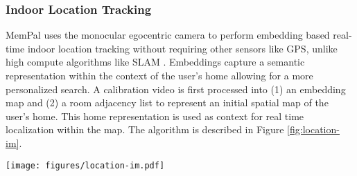 \subsubsection{Indoor Location Tracking}

MemPal uses the monocular egocentric camera to perform embedding based real-time indoor location tracking without requiring other sensors like GPS, unlike high compute algorithms like SLAM \cite{ventura2014global}. Embeddings capture a semantic representation within the context of the user’s home allowing for a more personalized search. A calibration video is first processed into (1) an embedding map and (2) a room adjacency list to represent an initial spatial map of the user's home. This home representation is used as context for real time localization within the map. The algorithm is described in Figure \ref{fig:location-im}. 

\begin{figure*}
    \centering
    \texttt{[image: figures/location-im.pdf]}
    \caption{Details of the indoor location tracking algorithm including calibration phase and localization.}
    \label{fig:location-im}
\end{figure*}

